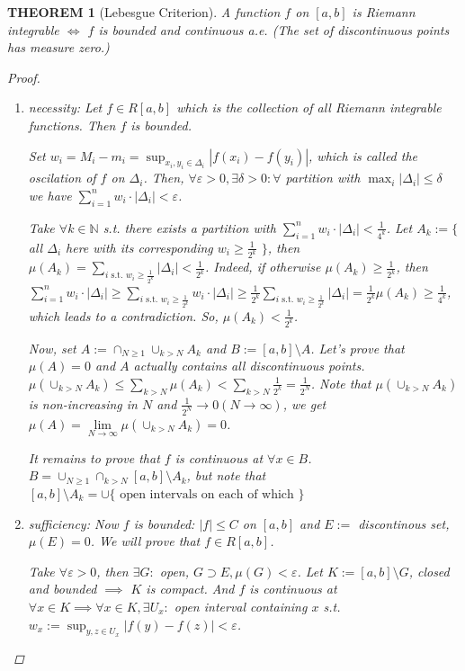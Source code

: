 \documentclass[12pt]{article}
\theoremstyle{blueplain}
\newtheorem{theorem}{THEOREM}[section]
\theoremstyle{bluedef}
\theoremstyle{blueremark}
\newcommand{\N}{\mathbb{N}}
\newcommand{\eps}{\varepsilon}
\numberwithin{equation}{section}
\begin{document}
\begin{theorem}[Lebesgue Criterion]

  A function $f$ on $[a,b]$ is Riemann integrable $\iff$ $f$ is bounded and continuous a.e. (The set of discontinuous points has measure zero.)
  \begin{proof}
    \begin{enumerate}
      \item necessity: Let $f \in R[a,b]$ which is the collection of all Riemann integrable functions. Then $f$ is bounded.

            Set $w_i = M_i - m_i = \sup_{x_i, y_i \in \Delta_i} |f(x_i) - f(y_i)|$, which is called the oscilation of $f$ on $\Delta_i$. Then, $\forall \eps > 0, \exists \delta > 0: \forall$ partition with $\max_i |\Delta_i| \leq \delta$ we have $\sum_{i=1}^n w_i \cdot |\Delta_i| < \eps$.

            Take $\forall k \in \N$ s.t. there exists a partition with $\sum_{i=1}^n w_i \cdot |\Delta_i| < \frac{1}{4^k}$. Let $A_k := \{$ all $\Delta_i$ here with its corresponding $w_i \geq \frac{1}{2^k}$ $\}$, then $\mu(A_k) = \sum_{i\text{ s.t. } w_i \geq \frac{1}{2^k}} |\Delta_i| < \frac{1}{2^k}$. Indeed, if otherwise $\mu(A_k) \geq \frac{1}{2^k}$, then $\sum_{i=1}^n w_i \cdot |\Delta_i| \geq \sum_{i\text{ s.t. } w_i \geq \frac{1}{2^k}} w_i \cdot |\Delta_i| \geq \frac{1}{2^k} \sum_{i\text{ s.t. } w_i \geq \frac{1}{2^k}} |\Delta_i| = \frac{1}{2^k} \mu(A_k) \geq \frac{1}{4^k}$, which leads to a contradiction. So, $\mu(A_k) < \frac{1}{2^k}$.

            Now, set $A := \cap_{N \geq 1} \cup_{k > N} A_k$ and $B := [a,b] \setminus A$. Let's prove that $\mu(A) = 0$ and $A$ actually contains all discontinuous points. $\mu(\cup_{k>N} A_k) \leq \sum_{k>N} \mu(A_k) < \sum_{k>N} \frac{1}{2^k} = \frac{1}{2^N}$. Note that $\mu(\cup_{k>N} A_k)$ is non-increasing in $N$ and $\frac{1}{2^N} \to 0 (N \to \infty)$, we get $\mu(A) = \lim\limits_{N \to \infty} \mu(\cup_{k>N} A_k) = 0$.

            It remains to prove that $f$ is continuous at $\forall x \in B$. $B = \cup_{N \geq 1} \cap_{k>N} [a,b] \setminus A_k$, but note that $[a,b] \setminus A_k = \cup \{\text{ open intervals on each of which }\}$
      \item sufficiency: Now $f$ is bounded: $|f| \leq C$ on $[a,b]$ and $E :=$ discontinous set, $\mu(E) = 0$. We will prove that $f \in R[a,b]$.

            Take $\forall \eps > 0$, then $\exists G:$ open, $G \supset E, \mu(G) < \eps$. Let $K := [a,b] \setminus G$, closed and bounded $\implies$ $K$ is compact. And $f$ is continuous at $\forall x \in K \implies \forall x \in K, \exists U_x:$ open interval containing $x$ s.t. $w_x := \sup_{y,z \in U_x} |f(y)-f(z)|<\eps$.


\end{enumerate}
\end{proof}
\end{theorem}
\end{document}
